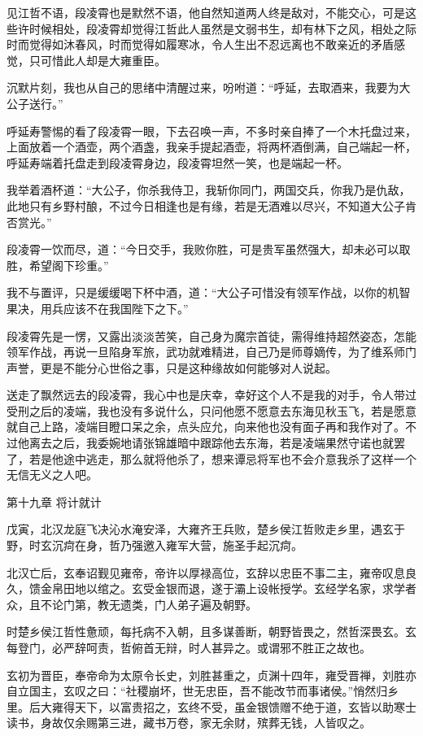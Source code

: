 见江哲不语，段凌霄也是默然不语，他自然知道两人终是敌对，不能交心，可是这些许时候相处，段凌霄却觉得江哲此人虽然是文弱书生，却有林下之风，相处之际时而觉得如沐春风，时而觉得如履寒冰，令人生出不忍远离也不敢亲近的矛盾感觉，只可惜此人却是大雍重臣。

沉默片刻，我也从自己的思绪中清醒过来，吩咐道：“呼延，去取酒来，我要为大公子送行。”

呼延寿警惕的看了段凌霄一眼，下去召唤一声，不多时亲自捧了一个木托盘过来，上面放着一个酒壶，两个酒盏，我亲手提起酒壶，将两杯酒倒满，自己端起一杯，呼延寿端着托盘走到段凌霄身边，段凌霄坦然一笑，也是端起一杯。

我举着酒杯道：“大公子，你杀我侍卫，我斩你同门，两国交兵，你我乃是仇敌，此地只有乡野村酿，不过今日相逢也是有缘，若是无酒难以尽兴，不知道大公子肯否赏光。”

段凌霄一饮而尽，道：“今日交手，我败你胜，可是贵军虽然强大，却未必可以取胜，希望阁下珍重。”

我不与置评，只是缓缓喝下杯中酒，道：“大公子可惜没有领军作战，以你的机智果决，用兵应该不在我国陛下之下。”

段凌霄先是一愣，又露出淡淡苦笑，自己身为魔宗首徒，需得维持超然姿态，怎能领军作战，再说一旦陷身军旅，武功就难精进，自己乃是师尊嫡传，为了维系师门声誉，更是不能分心世俗之事，只是这种缘故如何能够对人说起。

送走了飘然远去的段凌霄，我心中也是庆幸，幸好这个人不是我的对手，令人带过受刑之后的凌端，我也没有多说什么，只问他愿不愿意去东海见秋玉飞，若是愿意就自己上路，凌端目瞪口呆之余，点头应允，向来他也没有面子再和我作对了。不过他离去之后，我委婉地请张锦雄暗中跟踪他去东海，若是凌端果然守诺也就罢了，若是他途中逃走，那么就将他杀了，想来谭忌将军也不会介意我杀了这样一个无信无义之人吧。

第十九章    将计就计

戊寅，北汉龙庭飞决沁水淹安泽，大雍齐王兵败，楚乡侯江哲败走乡里，遇玄于野，时玄沉疴在身，哲乃强邀入雍军大营，施圣手起沉疴。

北汉亡后，玄奉诏觐见雍帝，帝许以厚禄高位，玄辞以忠臣不事二主，雍帝叹息良久，馈金帛田地以绾之。玄受金银而退，遂于灞上设帐授学。玄经学名家，求学者众，且不论门第，教无遗类，门人弟子遍及朝野。

时楚乡侯江哲性惫顽，每托病不入朝，且多谋善断，朝野皆畏之，然哲深畏玄。玄每登门，必严辞呵责，哲俯首无辩，时人甚异之。或谓邪不胜正之故也。

玄初为晋臣，奉帝命为太原令长史，刘胜甚重之，贞渊十四年，雍受晋禅，刘胜亦自立国主，玄叹之曰：“社稷崩坏，世无忠臣，吾不能改节而事诸侯。”悄然归乡里。后大雍得天下，以富贵招之，玄终不受，虽金银馈赠不绝于道，玄皆以助寒士读书，身故仅余赐第三进，藏书万卷，家无余财，殡葬无钱，人皆叹之。

